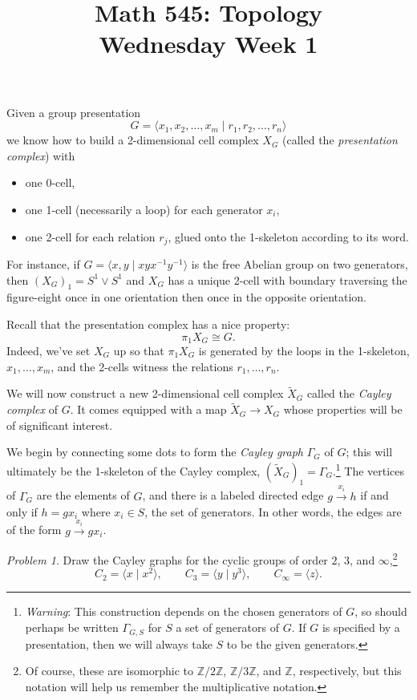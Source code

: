 \documentclass[11pt,twoside]{amsart}
\title{Math 545: Topology\\ Wednesday Week 1}
\theoremstyle{plain}
\theoremstyle{remark}
\newtheorem{prob}{Problem}
\theoremstyle{definition}
\theoremstyle{definition}
\newcommand{\ZZ}{\mathbb{Z}}
\begin{document}
\maketitle

Given a group presentation
\[
  G = \langle x_1,x_2,\ldots,x_m\mid r_1,r_2,\ldots,r_n\rangle
\]
we know how to build a 2-dimensional cell complex $X_G$ (called the \emph{presentation complex}) with
\begin{itemize}
\item one 0-cell,
\item one 1-cell (necessarily a loop) for each generator $x_i$,
\item one 2-cell for each relation $r_j$, glued onto the 1-skeleton according to its word.
\end{itemize}
For instance, if $G = \langle x,y\mid xyx^{-1}y^{-1}\rangle$ is the free Abelian group on two generators, then $(X_G)_1 = S^1\vee S^1$ and $X_G$ has a unique 2-cell with boundary traversing the figure-eight once in one orientation then once in the opposite orientation.

Recall that the presentation complex has a nice property:
\[
  \pi_1 X_G \cong G.
\]
Indeed, we've set $X_G$ up so that $\pi_1X_G$ is generated by the loops in the 1-skeleton, $x_1,\ldots,x_m$, and the 2-cells witness the relations $r_1,\ldots,r_n$.

We will now construct a new 2-dimensional cell complex $\tilde X_G$ called the \emph{Cayley complex} of $G$. It comes equipped with a map $\tilde X_G\to X_G$ whose properties will be of significant interest.

We begin by connecting some dots to form the \emph{Cayley graph} $\Gamma_G$ of $G$; this will ultimately be the 1-skeleton of the Cayley complex, $(\tilde X_G)_1 = \Gamma_G$.\footnote{\emph{Warning}: This construction depends on the chosen generators of $G$, so should perhaps be written $\Gamma_{G,S}$ for $S$ a set of generators of $G$. If $G$ is specified by a presentation, then we will always take $S$ to be the given generators.} The vertices of $\Gamma_G$ are the elements of $G$, and there is a labeled directed edge $g\xrightarrow{x_i}h$ if and only if $h = gx_i$ where $x_i\in S$, the set of generators. In other words, the edges are of the form $g\xrightarrow{x_i}gx_i$.

\begin{prob}
Draw the Cayley graphs for the cyclic groups of order $2$, $3$, and $\infty$,\footnote{Of course, these are isomorphic to $\ZZ/2\ZZ$, $\ZZ/3\ZZ$, and $\ZZ$, respectively, but this notation will help us remember the multiplicative notation.}
\[
  C_2 = \langle x\mid x^2\rangle,\qquad C_3 = \langle y\mid y^3\rangle,\qquad C_\infty = \langle z\rangle.
\]
\end{prob}
\end{document}
